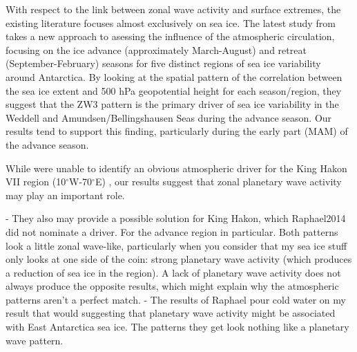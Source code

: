 With respect to the link between zonal wave activity and surface extremes, the existing literature focuses almost exclusively on sea ice. The latest study from \citet{Raphael2014} takes a new approach to asessing the influence of the atmospheric circulation, focusing on the ice advance (approximately March-August) and retreat (September-February) seasons for five distinct regions of sea ice variability around Antarctica. By looking at the spatial pattern of the correlation between the sea ice extent and 500 hPa geopotential height for each season/region, they suggest that the ZW3 pattern is the primary driver of sea ice variability in the Weddell and Amundsen/Bellingshausen Seas during the advance season. Our results tend to support this finding, particularly during the early part (MAM) of the advance season.  

While \citet{Raphael2014} were unable to identify an obvious atmospheric driver for the King Hakon VII region (10$^{\circ}$W-70$^{\circ}$E) \citet{Raphael2014}, our results suggest that zonal planetary wave activity may play an important role.  


- They also may provide a possible solution for King Hakon, which Raphael2014 did not nominate a driver. For the advance region in particular. Both patterns look a little zonal wave-like, particularly when you consider that my sea ice stuff only looks at one side of the coin: strong planetary wave activity (which produces a reduction of sea ice in the region). A lack of planetary wave activity does not always produce the opposite results, which might explain why the atmospheric patterns aren't a perfect match.
- The results of Raphael pour cold water on my result that would suggesting that planetary wave activity might be associated with East Antarctica sea ice. The patterns they get look nothing like a planetary wave pattern. 







